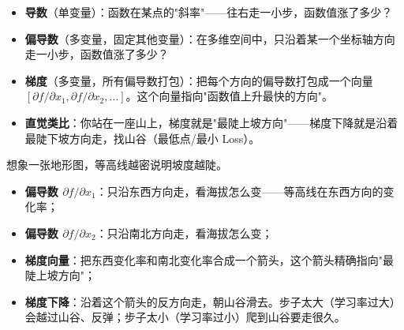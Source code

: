 \documentclass[a4paper,11pt]{ctexart}
\begin{document}
\begin{beginnerbox}
    \begin{itemize}
        \item \textbf{导数}（单变量）：函数在某点的"斜率"——往右走一小步，函数值涨了多少？
        \item \textbf{偏导数}（多变量，固定其他变量）：在多维空间中，只沿着某一个坐标轴方向走一小步，函数值涨了多少？
        \item \textbf{梯度}（多变量，所有偏导数打包）：把每个方向的偏导数打包成一个向量 $[\partial f/\partial x_1, \partial f/\partial x_2, \ldots]$。这个向量指向"函数值上升最快的方向"。
        \item \textbf{直觉类比}：你站在一座山上，梯度就是"最陡上坡方向"——梯度下降就是沿着最陡下坡方向走，找山谷（最低点/最小 Loss）。
    \end{itemize}
\end{beginnerbox}

\begin{metaphorbox}
    想象一张地形图，等高线越密说明坡度越陡。

    \begin{itemize}
        \item \textbf{偏导数 $\partial f/\partial x_1$}：只沿东西方向走，看海拔怎么变——等高线在东西方向的变化率；
        \item \textbf{偏导数 $\partial f/\partial x_2$}：只沿南北方向走，看海拔怎么变；
        \item \textbf{梯度向量}：把东西变化率和南北变化率合成一个箭头，这个箭头精确指向"最陡上坡方向"；
        \item \textbf{梯度下降}：沿着这个箭头的反方向走，朝山谷滑去。步子太大（学习率过大）会越过山谷、反弹；步子太小（学习率过小）爬到山谷要走很久。
    \end{itemize}
\end{metaphorbox}
\end{document}
